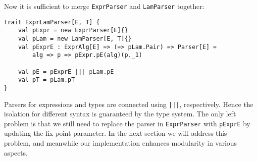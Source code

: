 Now it is sufficient to merge \lstinline{ExprParser} and \lstinline{LamParser} together:
\begin{lstlisting}
trait ExprLamParser[E, T] {
    val pExpr = new ExprParser[E]{}
    val pLam = new LamParser[E, T]{}
    val pExprE : ExprAlg[E] => (=> pLam.Pair) => Parser[E] =
        alg => p => pExpr.pE(alg)(p._1)

    val pE = pExprE ||| pLam.pE
    val pT = pLam.pT
}
\end{lstlisting}
Parsers for expressions and types are connected using \lstinline{|||}, respectively. Hence the isolation for different syntax
is guaranteed by the type system. The only left problem is that we still need to replace the parser in \lstinline{ExprParser} with \lstinline{pExprE}
by updating the fix-point parameter. In the next section we will address this problem, and meanwhile our implementation enhances modularity in various aspects.

